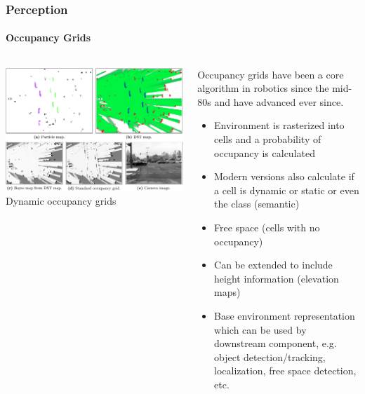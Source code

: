 \begin{frame}
\frametitle{Perception}
\framesubtitle{Occupancy Grids}
\begin{columns}[]
    \begin{column}{.5\textwidth}
        \centering
        \includegraphics[width=\textwidth]{images/tanzmeister_dynamic_grids.png}\\
        \tiny{Dynamic occupancy grids \cite{TanzmeisterDissertation2016}}
    \end{column}
    \begin{column}{.5\textwidth}
        \footnotesize
        Occupancy grids have been a core algorithm in robotics since the
        mid-80s \cite{Moravec1985-ef} and have advanced ever since.
        \begin{itemize}
            \item Environment is rasterized into cells and a probability of
                occupancy is calculated
            \item Modern versions also calculate if a cell is dynamic or static
                or even the class (semantic)
            \item Free space (cells with no occupancy)
            \item Can be extended to include height information (elevation maps)
            \item Base environment representation which can be used by downstream
                component, e.g. object detection/tracking, localization, free space
                detection, etc.
        \end{itemize}
    \end{column}
\end{columns}
\end{frame}

